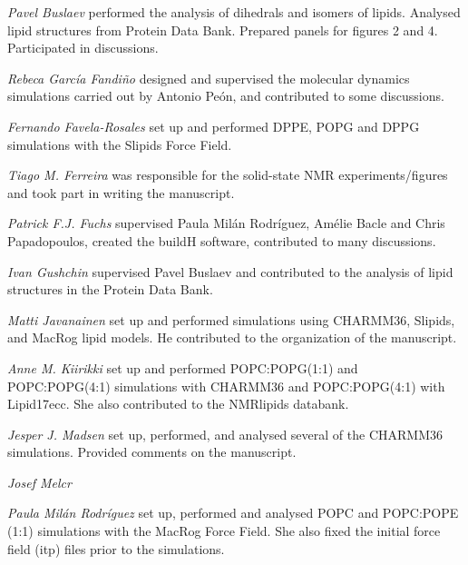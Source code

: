 \documentclass[journal=jpcbfk]{achemso}
\begin{document}
\noindent
{\it Pavel Buslaev}
performed the analysis of dihedrals and isomers of lipids. Analysed lipid structures from Protein Data Bank. Prepared panels for figures 2 and 4. Participated in discussions.

\noindent
{\it Rebeca Garc{\'i}a Fandi{\~n}o}
designed and supervised the molecular dynamics simulations carried out by Antonio Pe{\'o}n, and contributed to some discussions.

\noindent
{\it Fernando Favela-Rosales} 
set up and performed DPPE, POPG and DPPG simulations with the Slipids Force Field.

\noindent
{\it Tiago M. Ferreira}
was responsible for the solid-state NMR experiments/figures and took part in writing the manuscript.

\noindent
{\it Patrick F.J. Fuchs} supervised Paula Mil{\'a}n Rodr{\'i}guez, Am{\'e}lie Bacle and Chris Papadopoulos, created the buildH software, contributed to many discussions.

\noindent
{\it Ivan Gushchin} supervised Pavel Buslaev and contributed to the analysis of lipid structures in the Protein Data Bank.

\noindent
{\it Matti Javanainen} set up and performed simulations using CHARMM36, Slipids, and MacRog lipid models. He contributed to the organization of the manuscript.

\noindent
{\it Anne M. Kiirikki} set up and performed POPC:POPG(1:1) and POPC:POPG(4:1) simulations with CHARMM36 and POPC:POPG(4:1) with Lipid17ecc. She also contributed to the NMRlipids databank.

\noindent
{\it Jesper J. Madsen}
set up, performed, and analysed several of the CHARMM36 simulations.
Provided comments on the manuscript.

\noindent
{\it Josef Melcr}

\noindent
{\it Paula Mil{\'a}n Rodr{\'i}guez} set up, performed and analysed POPC and POPC:POPE (1:1) simulations with the MacRog Force Field. She also fixed the initial force field (itp) files prior to the simulations.
\end{document}
